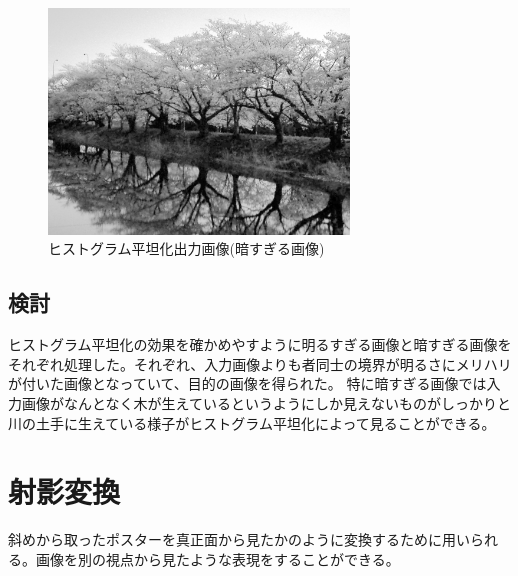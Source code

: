 \documentclass[11pt,a4j]{jsarticle}
\begin{document}
    \begin{figure}[H]
      \centering
      \includegraphics[clip,width=8.0cm ,height= 6.0cm]{./img/histgram/his_dark.png}
      \caption{ヒストグラム平坦化出力画像(暗すぎる画像)\label{fig:his_dark_result}}
    \end{figure}
    \subsection{検討}
    ヒストグラム平坦化の効果を確かめやすように明るすぎる画像と暗すぎる画像をそれぞれ処理した。それぞれ、入力画像よりも者同士の境界が明るさにメリハリが付いた画像となっていて、目的の画像を得られた。
    特に暗すぎる画像では入力画像がなんとなく木が生えているというようにしか見えないものがしっかりと川の土手に生えている様子がヒストグラム平坦化によって見ることができる。
    \section{射影変換}
    斜めから取ったポスターを真正面から見たかのように変換するために用いられる。画像を別の視点から見たような表現をすることができる。
\end{document}

